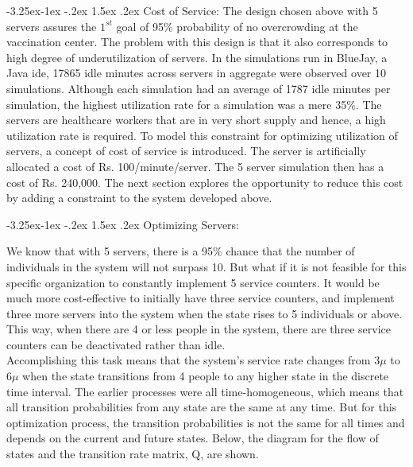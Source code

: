 \documentclass[11pt]{article}
\makeatletter
\renewcommand\subsection{\@startsection{subsection}{2}{\z@}%
                                         {-3.25ex\@plus -1ex \@minus -.2ex}%
                                         {1.5ex \@plus .2ex}%
                                         {\normalfont\fontfamily{phv}\fontsize{14}{17}\bfseries}}
\makeatother
\begin{document}
\subsection{Cost of Service:}
The design chosen above with 5 servers assures the $1^{st}$ goal of 95\% probability of no overcrowding at the vaccination center. The problem with this design is that it also corresponds to high degree of underutilization of servers. In the simulations run in BlueJay, a Java ide, 17865 idle minutes across servers in aggregate were observed over 10 simulations. Although each simulation had an average of 1787 idle minutes per simulation, the highest utilization rate for a simulation was a mere 35\%. The servers are healthcare workers that are in very short supply and hence, a high utilization rate is required. To model this constraint for optimizing utilization of servers, a concept of cost of service is introduced. The server is artificially allocated a cost of Rs. 100\rupee/minute/server. The 5 server simulation then has a cost of Rs. 240,000\rupee. The next section explores the opportunity to reduce this cost by adding a constraint to the system developed above.


\subsection{Optimizing Servers:}

We know that with 5 servers, there is a 95\% chance that the number of individuals in the system will not surpass 10. But what if it is not feasible for this specific organization to constantly implement 5 service counters. It would be much more cost-effective to initially have three service counters, and implement three more servers into the system when the state rises to 5 individuals or above. This way, when there are 4 or less people in the system, there are three service counters can be deactivated rather than idle. \\Accomplishing this task means that the system's service rate changes from $3\mu$ to $6\mu$ when the state transitions from 4 people to any higher state in the discrete time interval. The earlier processes were all time-homogeneous, which means that all transition probabilities from any state are the same at any time. But for this optimization process, the transition probabilities is not the same for all times and depends on the current and future states. Below, the diagram for the flow of states and the transition rate matrix, Q, are shown.
\end{document}
